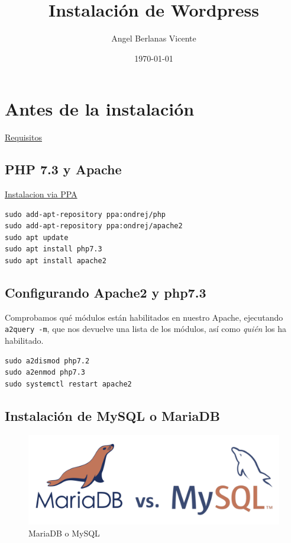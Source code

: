 \documentclass[11pt]{article}
\author{Angel Berlanas Vicente}
\date{\today}
\title{Instalación de Wordpress}
\begin{document}
\maketitle
\tableofcontents


\section{Antes de la instalación}
\label{sec-1}

\href{https://wordpress.org/support/article/before-you-install/}{Requisitos}

\subsection{PHP 7.3 y Apache}
\label{sec-1-1}

\href{https://r00t4bl3.com/post/how-to-install-php-7-3-on-ubuntu-18-04-bionic-beaver}{Instalacion
via PPA}

\begin{verbatim}
sudo add-apt-repository ppa:ondrej/php
sudo add-apt-repository ppa:ondrej/apache2
sudo apt update
sudo apt install php7.3
sudo apt install apache2
\end{verbatim}


\subsection{Configurando Apache2 y php7.3}
\label{sec-1-2}

Comprobamos qué módulos están habilitados en nuestro Apache, ejecutando \verb~a2query -m~, que nos devuelve una lista de los módulos, así como \emph{quién} los ha habilitado.

\begin{verbatim}
sudo a2dismod php7.2
sudo a2enmod php7.3
sudo systemctl restart apache2
\end{verbatim}

\subsection{Instalación de MySQL o MariaDB}
\label{sec-1-3}

\begin{figure}[htb]
\centering
\includegraphics[width=.9\linewidth]{./imgs/mariadb-vs-mysql.png}
\caption{MariaDB o MySQL}
\end{figure}
\end{document}
